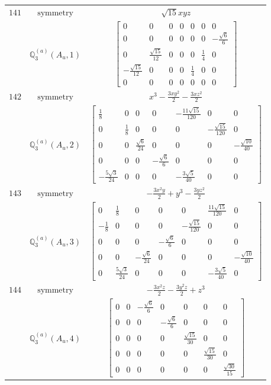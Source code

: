\documentclass[fleqn,8pt,landscape]{jsarticle}
\begin{document}
\begin{longtable}{ccc}
$ 141 $ & $ \text{symmetry} $ & $ \sqrt{15} x y z $ \\
$  $ & $ \mathbb{Q}_{3}^{(a)}(A_{u},1) $ & $ \begin{bmatrix} 0 & 0 & 0 & 0 & 0 & 0 & 0 \\ 0 & 0 & 0 & 0 & 0 & 0 & - \frac{\sqrt{6}}{6} \\ 0 & \frac{\sqrt{15}}{12} & 0 & 0 & 0 & \frac{1}{4} & 0 \\ - \frac{\sqrt{15}}{12} & 0 & 0 & 0 & \frac{1}{4} & 0 & 0 \\ 0 & 0 & 0 & 0 & 0 & 0 & 0 \end{bmatrix} $ \\ \hline
$ 142 $ & $ \text{symmetry} $ & $ x^{3} - \frac{3 x y^{2}}{2} - \frac{3 x z^{2}}{2} $ \\
$  $ & $ \mathbb{Q}_{3}^{(a)}(A_{u},2) $ & $ \begin{bmatrix} \frac{1}{8} & 0 & 0 & 0 & - \frac{11 \sqrt{15}}{120} & 0 & 0 \\ 0 & \frac{1}{8} & 0 & 0 & 0 & - \frac{\sqrt{15}}{120} & 0 \\ 0 & 0 & \frac{\sqrt{6}}{24} & 0 & 0 & 0 & - \frac{\sqrt{10}}{40} \\ 0 & 0 & 0 & - \frac{\sqrt{6}}{6} & 0 & 0 & 0 \\ - \frac{5 \sqrt{3}}{24} & 0 & 0 & 0 & - \frac{3 \sqrt{5}}{40} & 0 & 0 \end{bmatrix} $ \\ \hline
$ 143 $ & $ \text{symmetry} $ & $ - \frac{3 x^{2} y}{2} + y^{3} - \frac{3 y z^{2}}{2} $ \\
$  $ & $ \mathbb{Q}_{3}^{(a)}(A_{u},3) $ & $ \begin{bmatrix} 0 & \frac{1}{8} & 0 & 0 & 0 & \frac{11 \sqrt{15}}{120} & 0 \\ - \frac{1}{8} & 0 & 0 & 0 & - \frac{\sqrt{15}}{120} & 0 & 0 \\ 0 & 0 & 0 & - \frac{\sqrt{6}}{6} & 0 & 0 & 0 \\ 0 & 0 & - \frac{\sqrt{6}}{24} & 0 & 0 & 0 & - \frac{\sqrt{10}}{40} \\ 0 & \frac{5 \sqrt{3}}{24} & 0 & 0 & 0 & - \frac{3 \sqrt{5}}{40} & 0 \end{bmatrix} $ \\ \hline
$ 144 $ & $ \text{symmetry} $ & $ - \frac{3 x^{2} z}{2} - \frac{3 y^{2} z}{2} + z^{3} $ \\
$  $ & $ \mathbb{Q}_{3}^{(a)}(A_{u},4) $ & $ \begin{bmatrix} 0 & 0 & - \frac{\sqrt{6}}{6} & 0 & 0 & 0 & 0 \\ 0 & 0 & 0 & - \frac{\sqrt{6}}{6} & 0 & 0 & 0 \\ 0 & 0 & 0 & 0 & \frac{\sqrt{15}}{30} & 0 & 0 \\ 0 & 0 & 0 & 0 & 0 & \frac{\sqrt{15}}{30} & 0 \\ 0 & 0 & 0 & 0 & 0 & 0 & \frac{\sqrt{30}}{15} \end{bmatrix} $ \\ \hline

\end{longtable}
\end{document}
